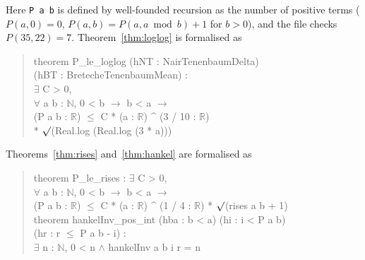 \documentclass[11pt]{amsart}
\theoremstyle{definition}
\theoremstyle{remark}
\newcommand{\lean}[1]{\texttt{#1}}
\begin{document}
Here \lean{P a b} is defined by well-founded recursion as the number of positive terms
($P(a,0)=0$, $P(a,b)=P(a,a\bmod b)+1$ for $b>0$), and the file checks $P(35,22)=7$.
Theorem~\ref{thm:loglog} is formalised as
\begin{quote}\ttfamily\small
theorem P\_le\_loglog (hNT : NairTenenbaumDelta)\\
\hspace*{2em}(hBT : BretecheTenenbaumMean) :\\
\hspace*{2em}$\exists$ C > 0,\\
\hspace*{2em}$\forall$ a b : $\mathbb N$, 0 < b $\to$ b < a $\to$\\
\hspace*{2em}(P a b : $\mathbb R$) $\le$ C * (a : $\mathbb R$) \^{} (3 / 10 : $\mathbb R$)\\
\hspace*{4em}* $\surd$(Real.log (Real.log (3 * a)))
\end{quote}
Theorems~\ref{thm:rises} and~\ref{thm:hankel} are formalised as
\begin{quote}\ttfamily\small
theorem P\_le\_rises : $\exists$ C > 0,\\
\hspace*{2em}$\forall$ a b : $\mathbb N$, 0 < b $\to$ b < a $\to$\\
\hspace*{2em}(P a b : $\mathbb R$) $\le$ C * (a : $\mathbb R$) \^{} (1 / 4 : $\mathbb R$) * $\surd$(rises a b + 1)\\[2pt]
theorem hankelInv\_pos\_int (hba : b < a) (hi : i < P a b)\\
\hspace*{2em}(hr : r $\le$ P a b - i) :\\
\hspace*{2em}$\exists$ n : $\mathbb N$, 0 < n $\wedge$ hankelInv a b i r = n
\end{quote}
\end{document}
